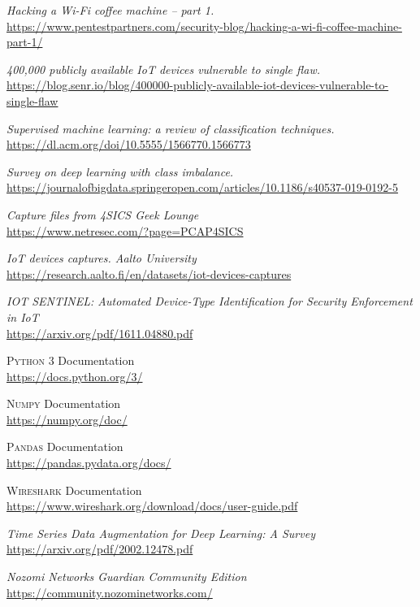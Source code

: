 \begin{thebibliography}{99}
\textit{Hacking a Wi-Fi coffee machine – part 1.}
\\\url{https://www.pentestpartners.com/security-blog/hacking-a-wi-fi-coffee-machine-part-1/}

\textit{400,000 publicly available IoT devices vulnerable to single
flaw.}
\\\url{https://blog.senr.io/blog/400000-publicly-available-iot-devices-vulnerable-to-single-flaw}

\textit{Supervised machine learning: a review of classification techniques.}
\\\url{https://dl.acm.org/doi/10.5555/1566770.1566773}

\textit{Survey on deep learning with class imbalance.}
\\\url{https://journalofbigdata.springeropen.com/articles/10.1186/s40537-019-0192-5}


\textit{Capture files from 4SICS Geek Lounge}
\\\url{https://www.netresec.com/?page=PCAP4SICS}

\textit{IoT devices captures. Aalto University}
\\\url{https://research.aalto.fi/en/datasets/iot-devices-captures}

\textit{IOT SENTINEL: Automated Device-Type
Identification for Security Enforcement in IoT}
\\\url{https://arxiv.org/pdf/1611.04880.pdf}

\textsc{Python 3} Documentation
\\\url{https://docs.python.org/3/}

\textsc{Numpy} Documentation
\\\url{https://numpy.org/doc/}

\textsc{Pandas} Documentation
\\\url{https://pandas.pydata.org/docs/}

\textsc{Wireshark} Documentation
\\\url{https://www.wireshark.org/download/docs/user-guide.pdf}

\textit{Time Series Data Augmentation for Deep Learning: A Survey}
\\\url{https://arxiv.org/pdf/2002.12478.pdf}



\textit{Nozomi Networks Guardian Community Edition}
\\\url{https://community.nozominetworks.com/}


\end{thebibliography}
